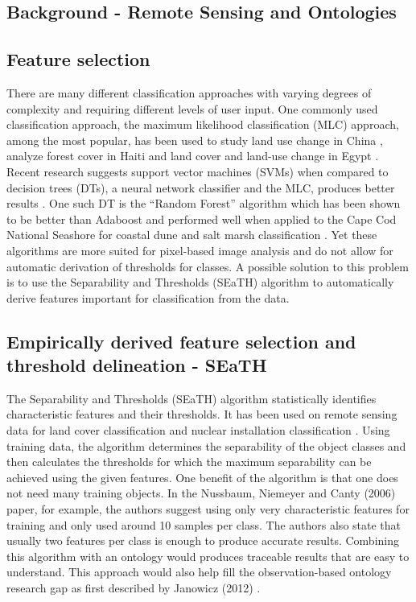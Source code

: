 \documentclass[a4paper,12pt]{article}
\begin{document}
\subsection{Background - Remote Sensing and Ontologies}


\subsection{Feature selection}
There are many different classification approaches with varying degrees of
complexity and requiring different levels of user input. One commonly used
classification approach, the maximum likelihood classification (MLC) approach,
among the most popular, has been used to study land use change in China
\cite{Ding2007}, analyze forest cover in Haiti \cite{Churches2014} and land
cover and land-use change in Egypt \cite{Shalaby2007}. Recent research suggests
support vector machines (SVMs) when compared to decision trees (DTs), a neural
network classifier and the MLC, produces better results \cite{Huang2002}. One
such DT is the ``Random Forest'' algorithm which has been shown to be better
than Adaboost \cite{Chan2008} and performed well when applied to the Cape Cod
National Seashore for coastal dune and salt marsh classification
\cite{Timm2012}.
Yet these algorithms are more suited for pixel-based image analysis and do not
allow for automatic derivation of thresholds for classes.
A possible solution to this problem is to use the Separability and Thresholds
(SEaTH) \cite{Nussbaum2006} algorithm to automatically derive features important
for classification from the data.
\subsection{Empirically derived feature selection and threshold delineation -
SEaTH} The Separability and Thresholds (SEaTH) algorithm \cite{Nussbaum2006}
statistically identifies characteristic features and their thresholds. It has
been used on remote sensing data for land cover classification \cite{Gao2011}
and nuclear installation classification \cite{Nussbaum2006}.
Using training data, the algorithm determines the separability of the object
classes and then calculates the thresholds for which the maximum separability
can be achieved using the given features. One benefit of the algorithm is that
one does not need many training objects.
In the Nussbaum, Niemeyer and Canty (2006) paper, for example, the authors
suggest using only very characteristic features for training and only used
around 10 samples per class\cite{Nussbaum2006}. The authors also state that
usually two features per class is enough to produce accurate results. Combining
this algorithm with an ontology would produces traceable results that are easy
to understand. This approach would also help fill the observation-based ontology
research gap as first described by Janowicz (2012) \cite{Janowicz2012}.
\end{document}
